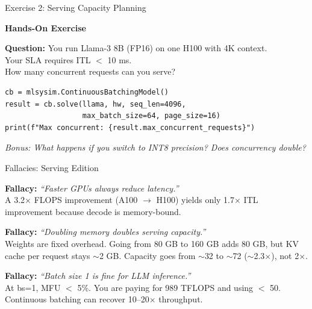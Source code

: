 \documentclass[aspectratio=169, 12pt]{beamer}
\begin{document}
\begin{frame}[fragile]{Exercise 2: Serving Capacity Planning}

\centering
\Large\bfseries
Hands-On Exercise\\[0.5cm]
\normalsize

\textbf{Question:} You run Llama-3 8B (FP16) on one H100 with 4K context.\\
Your SLA requires ITL $<$ 10 ms.\\
How many concurrent requests can you serve?

\vspace{0.3cm}
\begin{lstlisting}
cb = mlsysim.ContinuousBatchingModel()
result = cb.solve(llama, hw, seq_len=4096,
                  max_batch_size=64, page_size=16)
print(f"Max concurrent: {result.max_concurrent_requests}")
\end{lstlisting}

\vspace{0.2cm}
\textit{Bonus: What happens if you switch to INT8 precision?
Does concurrency double?}
\end{frame}

\begin{frame}{Fallacies: Serving Edition}

\small
\textbf{Fallacy:} \textit{``Faster GPUs always reduce latency.''}\\
A 3.2$\times$ FLOPS improvement (A100 $\to$ H100) yields only
1.7$\times$ ITL improvement because decode is memory-bound.

\vspace{0.3cm}
\textbf{Fallacy:} \textit{``Doubling memory doubles serving capacity.''}\\
Weights are fixed overhead. Going from 80 GB to 160 GB adds 80 GB,
but KV cache per request stays $\sim$2 GB. Capacity goes from $\sim$32
to $\sim$72 ($\sim$2.3$\times$), not 2$\times$.

\vspace{0.3cm}
\textbf{Fallacy:} \textit{``Batch size 1 is fine for LLM inference.''}\\
At bs=1, MFU $<$ 5\%. You are paying for 989 TFLOPS and using $<$ 50.
Continuous batching can recover 10--20$\times$ throughput.
\end{frame}
\end{document}
